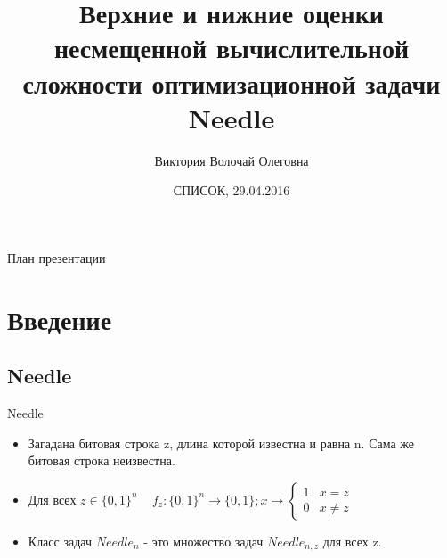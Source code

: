 \documentclass{beamer}
\begin{document}
\title[Оценки задачи Needle]{Верхние и нижние оценки несмещенной вычислительной сложности
оптимизационной задачи Needle}

\author[Виктория Волочай] {Виктория Волочай Олеговна}


\date{СПИСОК, 29.04.2016}

\subject{Theoretical Computer Science}

\begin{frame}
  \titlepage
\end{frame}

 \begin{frame}{План презентации}
  \tableofcontents
 \end{frame}

 \section{Введение}
 
 \subsection{Needle}
 \begin{frame}{Needle}
  \begin{itemize}
   \item Загадана битовая строка z, длина которой известна и равна n. Сама же битовая строка неизвестна.
   \item  Для всех $z \in \{0, 1\}^n \;\;\; $  
    \begin{math} 
    f_{z} : \{0, 1 \}^n \rightarrow \{0,1\}; x \rightarrow  \left\{ \begin{array}{ll}
    1 & \textrm{$x = z$}\\
    0 & \textrm{$x \ne z$}
    \end{array} \right.
    \end{math}

   \item Класс задач $Needle_n$ - это множество задач $Needle_{n, z}$ для всех z.
   \end{itemize} 
 \end{frame}
\end{document}
